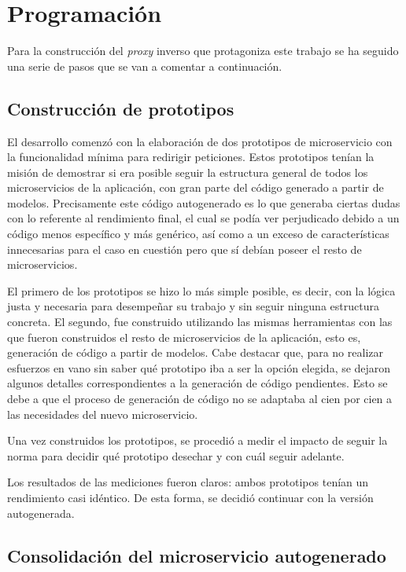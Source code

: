 \documentclass[11pt,spanish,listoffigures]{tfgetsinf}
\begin{document}

\section{Programación}

Para la construcción del \emph{proxy} inverso que protagoniza este trabajo se ha seguido una serie de pasos que se van a comentar a continuación.

\subsection{Construcción de prototipos}

El desarrollo comenzó con la elaboración de dos prototipos de microservicio con la funcionalidad mínima para redirigir peticiones. Estos prototipos tenían la misión de demostrar si era posible seguir la estructura general de todos los microservicios de la aplicación, con gran parte del código generado a partir de modelos. Precisamente este código autogenerado es lo que generaba ciertas dudas con lo referente al rendimiento final, el cual se podía ver perjudicado debido a un código menos específico y más genérico, así como a un exceso de características innecesarias para el caso en cuestión pero que sí debían poseer el resto de microservicios.

El primero de los prototipos se hizo lo más simple posible, es decir, con la lógica justa y necesaria para desempeñar su trabajo y sin seguir ninguna estructura concreta. El segundo, fue construido utilizando las mismas herramientas con las que fueron construidos el resto de microservicios de la aplicación, esto es, generación de código a partir de modelos. Cabe destacar que, para no realizar esfuerzos en vano sin saber qué prototipo iba a ser la opción elegida, se dejaron algunos detalles correspondientes a la generación de código pendientes. Esto se debe a que el proceso de generación de código no se adaptaba al cien por cien a las necesidades del nuevo microservicio.

Una vez construidos los prototipos, se procedió a medir el impacto de seguir la norma para decidir qué prototipo desechar y con cuál seguir adelante.

Los resultados de las mediciones fueron claros: ambos prototipos tenían un rendimiento casi idéntico. De esta forma, se decidió continuar con la versión autogenerada.

\subsection{Consolidación del microservicio autogenerado}
\end{document}
